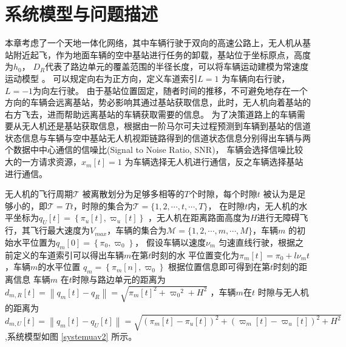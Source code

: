 \section{系统模型与问题描述}\label{section4-2}
本章考虑了一个天地一体化网络，其中车辆行驶于双向的高速公路上，无人机从基站附近起飞，作为地面车辆的空中基站进行任务的卸载，基站位于坐标原点，高度为$h_0$，
$D_R$代表了路边单元的覆盖范围的半径长度，可以将车辆运动建模为常速度运动模型 \supercite{COIFMAN1998271}。 可以规定向右为正方向，定义车道索引$L=1$ 为车辆向右行驶，$L=-1$为向左行驶。  %
由于基站位置固定，随者时间的推移，不可避免地存在一个方向的车辆会远离基站，势必影响其通过基站获取信息，此时，无人机向着基站的右方飞去，进而帮助远离基站的车辆获取需要的信息。
为了决策道路上的车辆需要从无人机还是基站获取信息，根据由一阶马尔可夫过程预测到车辆到基站的信道状态信息与车辆与空中基站无人机视距链路得到的信道状态信息分别得出车辆与两个数据中中心通信的信噪比(Signal to Noise Ratio, SNR)，
车辆会选择信噪比较大的一方请求资源，$x_m\left[t\right]=1$ 为车辆选择无人机进行通信，反之车辆选择基站进行通信。

无人机的飞行周期$\mathcal{T}$ 被离散划分为足够多相等的$T $个时隙，每个时隙$t$ 被认为是足够小的，即$\mathcal{T}=Tt $，时隙的集合为$\mathcal{T}=\{1,2,\cdots ,t,\cdots ,T\}$，
在时隙$t$内，无人机的水平坐标为$q_U\left[t\right]=\left\{\pi_u\left[t\right],\varpi_u\left[t\right]\right\}$
，无人机在距离路面高度为$H$进行无障碍飞行，其飞行最大速度为$V_{max}$，车辆的集合为$\mathcal{M}=\{1,2,\cdots ,m,\cdots ,M\}$，车辆$m$ 的初始水平位置为$q_m\left[0\right]=\left\{\pi_0,\varpi_0\right\}$，
假设车辆以速度$\nu_m$ 匀速直线行驶，根据之前定义的车道索引可以得出车辆$m$在第$t$时刻的水
平位置变化为$\pi_m\left[t\right]=\pi_0+l\nu_m t$，车辆$m$的水平位置 $q_m=\left\{\pi_m\left[n\right],\varpi_0\right\}$
根据位置信息即可得到在第$t$时刻的距离信息
车辆$m$ 在$t$时隙与路边单元的距离为${{d}_{m,R}}\left[ t \right]=\left\| {{q}_{m}}\left[ t \right]-{{q}_{R}} \right\|=\sqrt{{{\pi}_{m}}{{\left[ t \right]}^{2}}+{{\varpi}_{0}}^{2}+{{H}^{2}}}$
，车辆$m$在$t$ 时隙与无人机的距离为
$
{{d}_{m,U}}\left[ t \right]=\left\| {{q}_{m}}\left[ t \right]-{{q}_{U}}\left[ t \right] \right\|=\sqrt{{{\left( {{\pi}_{m}}\left[ t \right]-{{\pi}_{u}}\left[ t \right] \right)}^{2}}+{{\left( {{\varpi}_{m}}\left[ t \right]-{{\varpi}_{u}}\left[ t \right] \right)}^{2}}+{{H}^{2}}}\
$,系统模型如图 \ref{systemuav2} 所示。%

